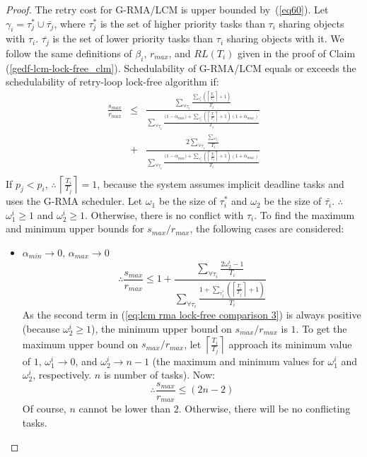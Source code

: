 \begin{proof}\normalfont

The retry cost for G-RMA/LCM is upper bounded by~(\ref{eq60}). Let $\gamma_{i}=\tau_{j}^{*}\cup\bar{\tau_{j}}$,
where $\tau_{j}^{*}$ is the set of higher priority tasks than $\tau_{i}$
sharing objects with $\tau_{i}$. $\bar{\tau_{j}}$ is the set
of lower priority tasks than $\tau_{i}$ sharing objects with
it. We follow the same definitions of $\beta_{i},\, r_{max}$, and
$RL(T_{i})$ given in the proof of Claim (\ref{gedf-lcm-lock-free_clm}).
Schedulability of G-RMA/LCM equals or exceeds the schedulability of retry-loop
lock-free algorithm if:
\begin{eqnarray}
\frac{s_{max}}{r_{max}} & \le & \frac{\sum_{\forall\tau_{i}}\frac{\sum_{\tau_{j}^{*}}\left(\left\lceil \frac{T_{i}}{T_{j}}\right\rceil +1\right)}{T_{i}}}{\sum_{\forall\tau_{i}}\frac{\Big(1-\alpha_{min}\Big)+\sum_{\tau_{j}^{*}}\left(\left\lceil \frac{T_{i}}{T_{j}}\right\rceil +1\right)\left(1+\alpha_{max}\right)}{T_{i}}}\nonumber\\
 & + & \frac{2\sum_{\forall\tau_{i}}\frac{\sum_{\forall\bar{\tau_{j}}}}{T_{i}}}{\sum_{\forall\tau_{i}}\frac{\Big(1-\alpha_{min}\Big)+\sum_{\tau_{j}^{*}}\left(\left\lceil \frac{T_{i}}{T_{j}}\right\rceil +1\right)\left(1+\alpha_{max}\right)}{T_{i}}}\nonumber\\
 & & \label{eq:lcm rma lock-free comparison 1} 
\end{eqnarray}
If $p_{j}<p_{i},\,\therefore\,\left\lceil \frac{T_{i}}{T_{j}}\right\rceil =1$, 
because the system assumes implicit deadline tasks and uses the G-RMA
scheduler. 
%
Let $\omega_{1}$ be the size of $\tau_i^*$ and $\omega_{2}$
be the size of $\bar{\tau_i}$. $\therefore$ $\omega_{1}^{i}\ge 1$ and $\omega_{2}^{i}\ge1$.
Otherwise, there is no conflict with $\tau_{i}$. To find the maximum
and minimum upper bounds for $s_{max}/r_{max}$, the following cases
are considered:
\begin{itemize}
\item $\alpha_{min}\rightarrow0,\,\alpha_{max}\rightarrow0$
\begin{equation}
\therefore\frac{s_{max}}{r_{max}}\le1+\frac{\sum_{\forall\tau_{i}}\frac{2\omega_{2}^{i}-1}{T_{i}}}{\sum_{\forall\tau_{i}}\frac{1+\sum_{\tau_{j}^{*}}\left(\left\lceil \frac{T_{i}}{T_{j}}\right\rceil +1\right)}{T_{i}}}\label{eq:lcm rma lock-free comparison 3}
\end{equation}
As the second term in (\ref{eq:lcm rma lock-free comparison 3}) is
always positive (because $\omega_{2}^{i}\ge1$), the minimum
upper bound on $s_{max}/r_{max}$ is $1$. To get the maximum upper
bound on $s_{max}/r_{max}$, let $\left\lceil \frac{T_{i}}{T_{j}}\right\rceil $
approach its minimum value of $1$, $\omega_{1}^{i}\rightarrow0$, and $\omega_{2}^{i}\rightarrow n-1$ 
(the maximum and minimum values for $\omega_{1}^{i}$ and $\omega_{2}^{i}$, 
respectively. $n$ is number of tasks). Now:
\[
\therefore\frac{s_{max}}{r_{max}}\le\left(2n-2\right)
\]
Of course, $n$ cannot be lower than $2$. Otherwise, there will be
no conflicting tasks.


\end{itemize}
\end{proof}
